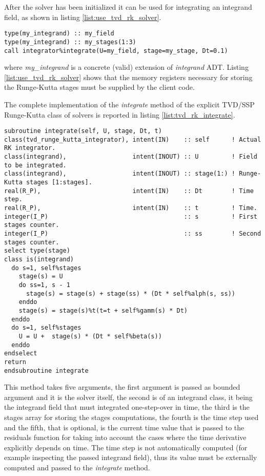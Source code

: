 After the solver has been initialized it can be used for integrating an integrand field, as shown in listing \ref{list:use_tvd_rk_solver}.

\begin{lstlisting}[firstnumber=1,style=code,caption={example of usage of a TVD/SSP Runge-Kutta integrator},label={list:use_tvd_rk_solver}]
type(my_integrand) :: my_field
type(my_integrand) :: my_stages(1:3)
call integrator%integrate(U=my_field, stage=my_stage, Dt=0.1)
\end{lstlisting}
where \emph{my\_integrand} is a concrete (valid) extension of \emph{integrand} ADT. Listing \ref{list:use_tvd_rk_solver} shows that the memory registers necessary for storing the Runge-Kutta stages must be supplied by the client code.

The complete implementation of the \emph{integrate} method of the explicit TVD/SSP Runge-Kutta class of solvers is reported in listing \ref{list:tvd_rk_integrate}.

\begin{lstlisting}[firstnumber=1,style=code,caption={implementation of the \emph{integrate} method of explicit TVD/SSP Runge-Kutta class},label={list:tvd_rk_integrate}]
subroutine integrate(self, U, stage, Dt, t)
class(tvd_runge_kutta_integrator), intent(IN)    :: self      ! Actual RK integrator.
class(integrand),                  intent(INOUT) :: U         ! Field to be integrated.
class(integrand),                  intent(INOUT) :: stage(1:) ! Runge-Kutta stages [1:stages].
real(R_P),                         intent(IN)    :: Dt        ! Time step.
real(R_P),                         intent(IN)    :: t         ! Time.
integer(I_P)                                     :: s         ! First stages counter.
integer(I_P)                                     :: ss        ! Second stages counter.
select type(stage)
class is(integrand)
  do s=1, self%stages
    stage(s) = U
    do ss=1, s - 1
      stage(s) = stage(s) + stage(ss) * (Dt * self%alph(s, ss))
    enddo
    stage(s) = stage(s)%t(t=t + self%gamm(s) * Dt)
  enddo
  do s=1, self%stages
    U = U +  stage(s) * (Dt * self%beta(s))
  enddo
endselect
return
endsubroutine integrate
\end{lstlisting}

This method takes five arguments, the first argument is passed as bounded argument and it is the solver itself, the second is of an integrand class, it being the integrand field that must integrated one-step-over in time, the third is the stages array for storing the stages computations, the fourth is the time step used and the fifth, that is optional, is the current time value that is passed to the residuals function for taking into account the cases where the time derivative explicitly depends on time. The time step is not automatically computed (for example inspecting the passed integrand field), thus its value must be externally computed and passed to the \emph{integrate} method.

